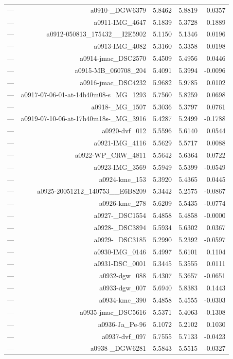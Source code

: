 \begin{table}[htbp]
\begin{tabular}{lrrrr}
— & a0910-_DGW6379 & 5.8462 & 5.8819 & 0.0357 \\
— & a0911-IMG_4647 & 5.1839 & 5.3728 & 0.1889 \\
— & a0912-050813_175432__I2E5902 & 5.1150 & 5.1346 & 0.0196 \\
— & a0913-IMG_4082 & 5.3160 & 5.3358 & 0.0198 \\
— & a0914-jmac_DSC2570 & 5.4509 & 5.4956 & 0.0446 \\
— & a0915-MB_060708_204 & 5.4091 & 5.3994 & -0.0096 \\
— & a0916-jmac_DSC4232 & 5.9682 & 5.9785 & 0.0102 \\
— & a0917-07-06-01-at-14h40m08-s_MG_1293 & 5.7560 & 5.8259 & 0.0698 \\
— & a0918-_MG_1507 & 5.3036 & 5.3797 & 0.0761 \\
— & a0919-07-10-06-at-17h40m18s-_MG_3916 & 5.4287 & 5.2499 & -0.1788 \\
— & a0920-dvf_012 & 5.5596 & 5.6140 & 0.0544 \\
— & a0921-IMG_4116 & 5.5629 & 5.5717 & 0.0088 \\
— & a0922-WP_CRW_4811 & 5.5642 & 5.6364 & 0.0722 \\
— & a0923-IMG_3569 & 5.5949 & 5.5399 & -0.0549 \\
— & a0924-kme_153 & 5.3920 & 5.4365 & 0.0445 \\
— & a0925-20051212_140753__E6B8209 & 5.3442 & 5.2575 & -0.0867 \\
— & a0926-kme_278 & 5.6209 & 5.5435 & -0.0774 \\
— & a0927-_DSC1554 & 5.4858 & 5.4858 & -0.0000 \\
— & a0928-_DSC3894 & 5.5934 & 5.6302 & 0.0367 \\
— & a0929-_DSC3185 & 5.2990 & 5.2392 & -0.0597 \\
— & a0930-IMG_0146 & 5.4997 & 5.6101 & 0.1104 \\
— & a0931-DSC_0001 & 5.3445 & 5.3555 & 0.0111 \\
— & a0932-dgw_088 & 5.4307 & 5.3657 & -0.0651 \\
— & a0933-dgw_007 & 5.6940 & 5.8383 & 0.1443 \\
— & a0934-kme_390 & 5.4858 & 5.4555 & -0.0303 \\
— & a0935-jmac_DSC5616 & 5.5371 & 5.4063 & -0.1308 \\
— & a0936-Ja_Pe-96 & 5.1072 & 5.2102 & 0.1030 \\
— & a0937-dvf_097 & 5.7555 & 5.7133 & -0.0423 \\
— & a0938-_DGW6281 & 5.5843 & 5.5515 & -0.0327 \\

\end{tabular}
\end{table}
